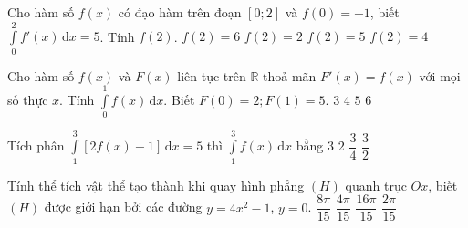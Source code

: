 \begin{ex}%
	Cho hàm số $f\left(x\right)$ có đạo hàm trên đoạn $\left[0;2\right]$ và $f\left(0\right) = - 1$, biết $\displaystyle\int\limits_{0}^{2} f'\left(x\right)\mathrm{\,d}x = 5$. Tính $f\left(2\right)$.
	\choice
	{$f\left(2\right) = 6$}
	{$f\left(2\right) = 2$}
	{$f\left(2\right) = 5$}
	{\True $f\left(2\right) = 4$}
\end{ex}
\begin{ex}%
	Cho hàm số $f(x)$ và $F(x)$ liên tục trên $\mathbb{R}$ thoả mãn $F'(x)=f(x)$ với mọi số thực $x$. Tính   $\displaystyle \int\limits_0^1 f(x)\mathrm{\,d}x$. Biết $F(0)=2; F(1)=5$.
	\choice
	{\True $3$}
	{$4$}
	{$5$}
	{$6$}
\end{ex}
\begin{ex}%
	Tích phân $\displaystyle\int\limits_{1}^{3}\left[2f(x)+1\right]\mathrm{\,d}x=5$ thì $\displaystyle\int\limits_{1}^{3} f(x)\mathrm{\,d}x$ bằng	
	\choice
	{$3$}
	{$2$}
	{$\dfrac{3}{4}$}
	{\True$\dfrac{3}{2}$}
\end{ex}

\begin{ex}%
	Tính thể tích vật thể tạo thành khi quay hình phẳng $(H)$ quanh trục $Ox$, biết $(H)$ được giới hạn bởi các đường $y=4x^2-1$, $y=0$.
	\choice
	{\True $\dfrac{8\pi}{15}$}
	{$\dfrac{4\pi}{15}$}
	{$\dfrac{16\pi}{15}$}
	{$\dfrac{2\pi}{15}$}
\end{ex}

